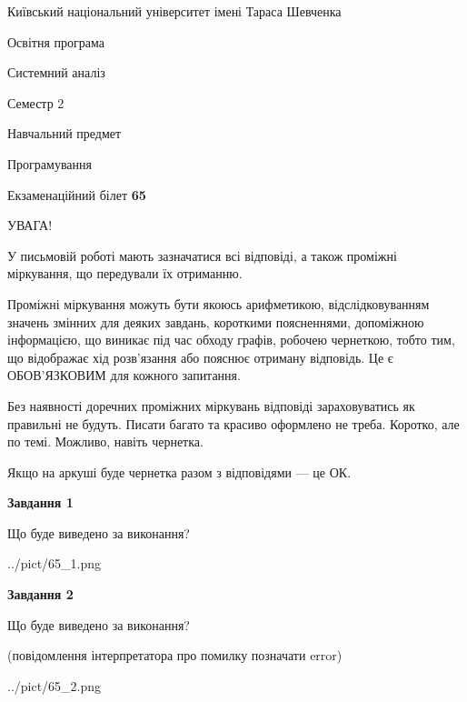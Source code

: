 \documentclass[12pt, ukrainian]{article}
\begin{document}
{{\begin {small}\par
{ \center  Київський національний університет імені Тараса Шевченка \par}
{\parbox {5 cm}{Освітня програма \hfill}{\parbox {7 cm}{Системний аналіз \hfill}}\parbox {6 cm}{\hfill Семестр 2}}\par
{\parbox {5 cm} {Навчальний предмет \hfill}\parbox {7 cm}{Програмування \hfill}\parbox {6cm}{\hfill}\par}\vspace{-7pt} \end{small}}{\center Екзаменаційний білет \No \textbf
{ 65 }\par}}
{
\begin {large}
УВАГА!

У письмовій роботі мають зазначатися всі відповіді, а також проміжні міркування, що передували їх отриманню.

Проміжні міркування можуть бути якоюсь арифметикою, відслідковуванням зна\-чень змінних для деяких завдань,
короткими поясненнями, допоміжною інформацією, що виникає під час обходу графів, робочею чернеткою,
тобто тим, що відображає хід розв’язання або пояснює отриману відповідь.
Це є ОБОВ’ЯЗКОВИМ для кожного запитання.

Без наявності доречних проміжних міркувань відповіді зараховуватись як правиль\-ні не будуть.
Писати багато та красиво оформлено не треба. Коротко, але по темі. Можли\-во, навіть чернетка.

Якщо на аркуші буде чернетка разом з відповідями --- це ОК.

\newpage

{\begin {center}\textbf{Завдання 1}\end {center}}\par
Що буде виведено за виконання?\par
\begin{center}
	{../pict/65_1.png}
\end{center}
\newpage

{\begin {center}\textbf{Завдання 2}\end {center}}\par
Що буде виведено за виконання?\par
 (повідомлення інтерпретатора про помилку позначати error)\par
\begin{center}
	{../pict/65_2.png}
\end{center}
\newpage


\end{large}}
\end{document}
